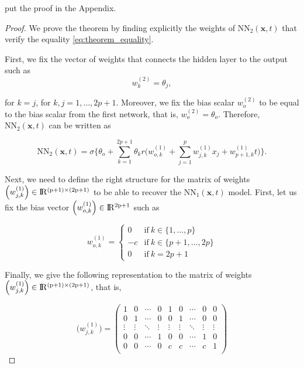 \documentclass{article}
\def\x{\mathbf x}
\def \real{\rm I\!R}
\def \vahid {\color{magenta}}
\begin{document}
{\vahid put the proof in the Appendix.}
\begin{proof}
We prove the theorem by finding explicitly the weights of $\mathrm{NN}_2(\x,t)$ that verify the equality \eqref{eq:theorem_equality}.

First, we fix the vector of weights that connects the hidden layer to the output such as 
$$w_{k}^{(2)} = \theta_j,$$ 

for $k=j$, for $k,j=1,\ldots,2p+1$. Moreover, we fix the bias scalar $w_o^{(2)}$ to be equal to the bias scalar from the first network, that is, $w_o^{(2)} = \theta_o$. Therefore, $\mathrm{NN}_2(\x,t)$ can be written as

\begin{equation}
    \mathrm{NN}_2(\x,t) = \sigma \biggl\{ \theta_o + \sum_{k=1}^{2p+1} \theta_k  r\Big(w_{o,k}^{(1)} + \sum_{j=1}^{p} w_{j,k}^{(1)} x_j +  w_{p+1,k}^{(1)} t \Big)  \biggr\}.
    \label{eq:neural_network2_proof}
\end{equation}

Next, we need to define the right structure for the matrix of weights $\Big(w_{j,k}^{(1)}\Big) \in \real^{(p+1) \times (2p+1)}$ to be able to recover the 
$\mathrm{NN}_1(\x,t)$ model. First, let us fix the bias vector $\Big(w_{o,k}^{(1)}\Big) \in \real^{2p+1}$ such as

\[ w_{o,k}^{(1)} = 
    \left\{ \begin{array}{cl}
      0 & \mathrm{if}~k \in \{1,\ldots,p\}\\
      -c & \mathrm{if}~k \in \{p+1, \ldots, 2p\}\\
      0 & \mathrm{if}~k=2p+1 
            \end{array} \right.
\]

Finally, we give the following representation to the matrix of weights $\Big(w_{j,k}^{(1)}\Big) \in \real^{(p+1) \times (2p+1)}$, that is,


\[ \Big(w_{j,k}^{(1)}\Big) = 
\left(
\begin{array}{cccc|cccc|c}
1 & 0 & \cdots & 0 & 1 & 0 & \cdots & 0 & 0  \\
0 & 1 & \cdots & 0 & 0 & 1 & \cdots & 0 & 0  \\
\vdots  & \vdots  & \ddots & \vdots & \vdots  & \vdots  & \ddots & \vdots & \vdots  \\
0 & 0 & \cdots & 1 & 0 & 0 & \cdots & 1 & 0  \\
\hline
0 & 0 & \cdots & 0 & c & c & \cdots & c & 1  \\
\end{array}
\right)
\]



\end{proof}
\end{document}
